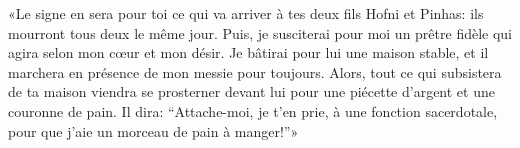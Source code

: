 «Le signe en sera pour toi ce qui va arriver à tes deux fils Hofni et Pinhas:
	ils mourront tous deux le même jour.
Puis, je susciterai pour moi un prêtre fidèle qui agira selon mon cœur et mon désir.
Je bâtirai pour lui une maison stable,
	et il marchera en présence de mon messie pour toujours.
Alors, tout ce qui subsistera de ta maison viendra se prosterner devant lui
	pour une piécette d’argent et une couronne de pain.
Il dira: “Attache-moi, je t’en prie, à une fonction sacerdotale,
	pour que j’aie un morceau de pain à manger!”»
